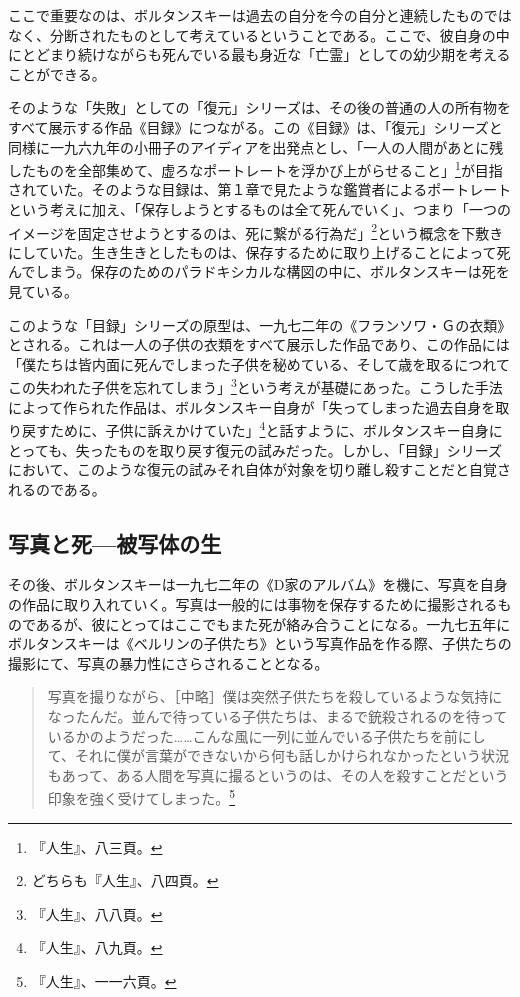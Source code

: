 \documentclass[b5j,twoside,twocolumn]{utarticle}
\begin{document}
ここで重要なのは、ボルタンスキーは過去の自分を今の自分と連続したものではなく、分断されたものとして考えているということである。ここで、彼自身の中にとどまり続けながらも死んでいる最も身近な「亡霊」としての幼少期を考えることができる。


そのような「失敗」としての「復元」シリーズは、その後の普通の人の所有物をすべて展示する作品《目録》につながる。この《目録》は、「復元」シリーズと同様に一九六九年の小冊子のアイディアを出発点とし、「一人の人間があとに残したものを全部集めて、虚ろなポートレートを浮かび上がらせること」\footnote{『人生』、八三頁。}が目指されていた。そのような目録は、第１章で見たような鑑賞者によるポートレートという考えに加え、「保存しようとするものは全て死んでいく」、つまり「一つのイメージを固定させようとするのは、死に繋がる行為だ」\footnote{どちらも『人生』、八四頁。}という概念を下敷きにしていた。生き生きとしたものは、保存するために取り上げることによって死んでしまう。保存のためのパラドキシカルな構図の中に、ボルタンスキーは死を見ている。


このような「目録」シリーズの原型は、一九七二年の《フランソワ・Ｇの衣類》とされる。これは一人の子供の衣類をすべて展示した作品であり、この作品には「僕たちは皆内面に死んでしまった子供を秘めている、そして歳を取るにつれてこの失われた子供を忘れてしまう」\footnote{『人生』、八八頁。}という考えが基礎にあった。こうした手法によって作られた作品は、ボルタンスキー自身が「失ってしまった過去自身を取り戻すために、子供に訴えかけていた」\footnote{『人生』、八九頁。}と話すように、ボルタンスキー自身にとっても、失ったものを取り戻す復元の試みだった。しかし、「目録」シリーズにおいて、このような復元の試みそれ自体が対象を切り離し殺すことだと自覚されるのである。

\subsection{\tbaselineshift =4.0pt 写真と死---被写体の生}
その後、ボルタンスキーは一九七二年の《D家のアルバム》を機に、写真を自身の作品に取り入れていく。写真は一般的には事物を保存するために撮影されるものであるが、彼にとってはここでもまた死が絡み合うことになる。一九七五年にボルタンスキーは《ベルリンの子供たち》という写真作品を作る際、子供たちの撮影にて、写真の暴力性にさらされることとなる。

\begin{quote}
写真を撮りながら、［中略］僕は突然子供たちを殺しているような気持になったんだ。並んで待っている子供たちは、まるで銃殺されるのを待っているかのようだった……こんな風に一列に並んでいる子供たちを前にして、それに僕が言葉ができないから何も話しかけられなかったという状況もあって、ある人間を写真に撮るというのは、その人を殺すことだという印象を強く受けてしまった。\footnote{『人生』、一一六頁。}
\end{quote}
\end{document}
